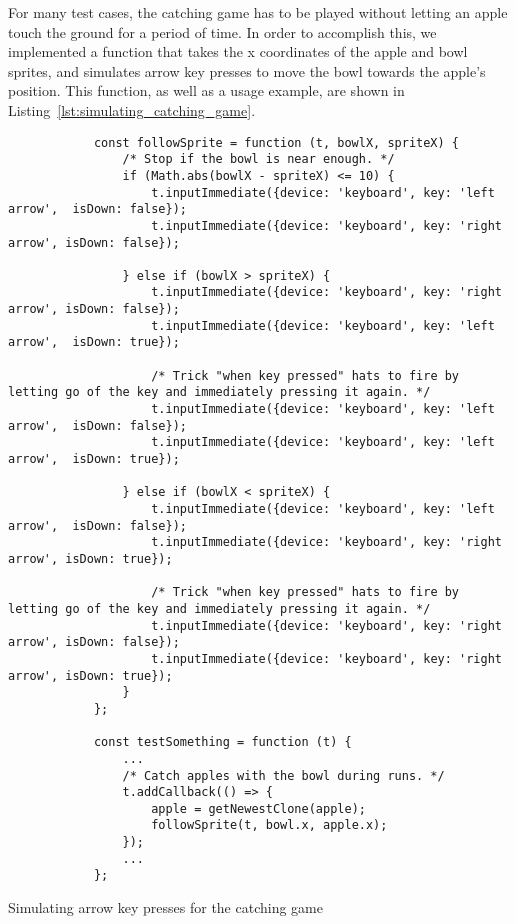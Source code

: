 For many test cases, the catching game has to be played without letting an apple touch the ground for a period of time.
In order to accomplish this, we implemented a function
that takes the x coordinates of the apple and bowl sprites,
and simulates arrow key presses to move the bowl towards the apple's position.
This function, as well as a usage example, are shown in Listing~\ref{lst:simulating_catching_game}.

\begin{listing}[htpb]
    \centering
    \begin{minipage}{.85\textwidth}
        \begin{verbatim}
            const followSprite = function (t, bowlX, spriteX) {
                /* Stop if the bowl is near enough. */
                if (Math.abs(bowlX - spriteX) <= 10) {
                    t.inputImmediate({device: 'keyboard', key: 'left arrow',  isDown: false});
                    t.inputImmediate({device: 'keyboard', key: 'right arrow', isDown: false});

                } else if (bowlX > spriteX) {
                    t.inputImmediate({device: 'keyboard', key: 'right arrow', isDown: false});
                    t.inputImmediate({device: 'keyboard', key: 'left arrow',  isDown: true});

                    /* Trick "when key pressed" hats to fire by letting go of the key and immediately pressing it again. */
                    t.inputImmediate({device: 'keyboard', key: 'left arrow',  isDown: false});
                    t.inputImmediate({device: 'keyboard', key: 'left arrow',  isDown: true});

                } else if (bowlX < spriteX) {
                    t.inputImmediate({device: 'keyboard', key: 'left arrow',  isDown: false});
                    t.inputImmediate({device: 'keyboard', key: 'right arrow', isDown: true});

                    /* Trick "when key pressed" hats to fire by letting go of the key and immediately pressing it again. */
                    t.inputImmediate({device: 'keyboard', key: 'right arrow', isDown: false});
                    t.inputImmediate({device: 'keyboard', key: 'right arrow', isDown: true});
                }
            };

            const testSomething = function (t) {
                ...
                /* Catch apples with the bowl during runs. */
                t.addCallback(() => {
                    apple = getNewestClone(apple);
                    followSprite(t, bowl.x, apple.x);
                });
                ...
            };
        \end{verbatim}
    \end{minipage}

    \caption{Simulating arrow key presses for the catching game}
    \label{lst:simulating_catching_game}
\end{listing}

